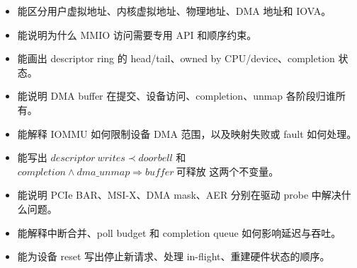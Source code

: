 \begin{rubricbox}
\begin{itemize}
\tightlist
\item 能区分用户虚拟地址、内核虚拟地址、物理地址、DMA 地址和 IOVA。
\item 能说明为什么 MMIO 访问需要专用 API 和顺序约束。
\item 能画出 descriptor ring 的 head/tail、owned by CPU/device、completion 状态。
\item 能说明 DMA buffer 在提交、设备访问、completion、unmap 各阶段归谁所有。
\item 能解释 IOMMU 如何限制设备 DMA 范围，以及映射失败或 fault 如何处理。
\item 能写出 \(descriptor\ writes \prec doorbell\) 和 \(completion \land dma\_unmap \Rightarrow buffer\ 可释放\) 这两个不变量。
\item 能说明 PCIe BAR、MSI-X、DMA mask、AER 分别在驱动 probe 中解决什么问题。
\item 能解释中断合并、poll budget 和 completion queue 如何影响延迟与吞吐。
\item 能为设备 reset 写出停止新请求、处理 in-flight、重建硬件状态的顺序。
\end{itemize}
\end{rubricbox}
